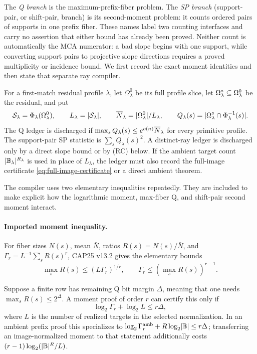 \documentclass[11pt,a4paper]{amsart}
\numberwithin{equation}{section}
\theoremstyle{remark}
\begin{document}
The \emph{Q branch} is the maximum-prefix-fiber problem.  The \emph{SP
branch} (support-pair, or shift-pair, branch) is its second-moment problem:
it counts ordered pairs of supports in one prefix fiber.  These names label
two counting interfaces and carry no assertion that either bound has
already been proved.  Neither count is automatically the MCA numerator: a
bad slope begins with one support, while converting support pairs to
projective slope directions requires a proved multiplicity or incidence
bound.  We first record the exact moment identities and then state that
separate ray compiler.

\begin{definition}\label{def:q-sp}
For a first-match residual profile \(\lambda\), let \(\Omega^0_\lambda\)
be its full profile slice, let
\(\Omega^{\circ}_\lambda\subseteq\Omega^0_\lambda\) be the residual, and put
\[
 \mathcal S_\lambda=\Phi_\lambda(\Omega^0_\lambda),\qquad
 L_\lambda=\lvert \mathcal S_\lambda\rvert,\qquad
 \overline N_\lambda=\lvert \Omega^0_\lambda\rvert/L_\lambda,
 \qquad
 Q_\lambda(s)=\lvert \Omega^{\circ}_\lambda\cap\Phi_\lambda^{-1}(s)\rvert.
\]
The Q ledger is discharged if
\(\max_sQ_\lambda(s)\le e^{o(n)}\overline N_\lambda\) for every primitive
profile.  The support-pair SP statistic is
\(\sum_sQ_\lambda(s)^2\).  A distinct-ray ledger is discharged only by a
direct slope bound or by \textup{(RC)} below.
If the ambient target count \(\lvert \mathbb B_\lambda\rvert^{R_\lambda}\) is used in
place of \(L_\lambda\), the ledger must also record the full-image
certificate \eqref{eq:full-image-certificate} or a direct ambient theorem.
\end{definition}


The compiler uses two elementary inequalities repeatedly.  They are included to make explicit how the logarithmic moment, max-fiber Q, and shift-pair second moment interact.

\paragraph{Imported moment inequality.}
For fiber sizes \(N(s)\), mean \(\bar N\), ratios \(R(s)=N(s)/\bar N\),
and \(\Gamma_r=L^{-1}\sum_sR(s)^r\), CAP25 v13.2
\cite[Sec.~19 and Apps.~E--F]{CAP25v132} gives the elementary bounds
\[
        \max_sR(s)\le(L\Gamma_r)^{1/r},
        \qquad
        \Gamma_r\le(\max_sR(s))^{r-1}.
        \tag{M}\label{eq:imported-moment-interface}
\]


\begin{corollary}\label{cor:finite-moment-floor}
Suppose a finite row has remaining Q bit margin \(\Delta\), meaning that one needs \(\max_sR(s)\le2^\Delta\).  A moment proof of order \(r\) can certify this only if
\[
        \log_2\Gamma_r+\log_2 L\le r\Delta,
\]
where \(L\) is the number of realized targets in the selected
normalization.  In an ambient prefix proof this specializes to
\(\log_2\Gamma_r^{\rm amb}+R\log_2\lvert \mathbb B\rvert\le r\Delta\); transferring an
image-normalized moment to that statement additionally costs
\((r-1)\log_2(\lvert \mathbb B\rvert^R/L)\).
\end{corollary}
\end{document}
